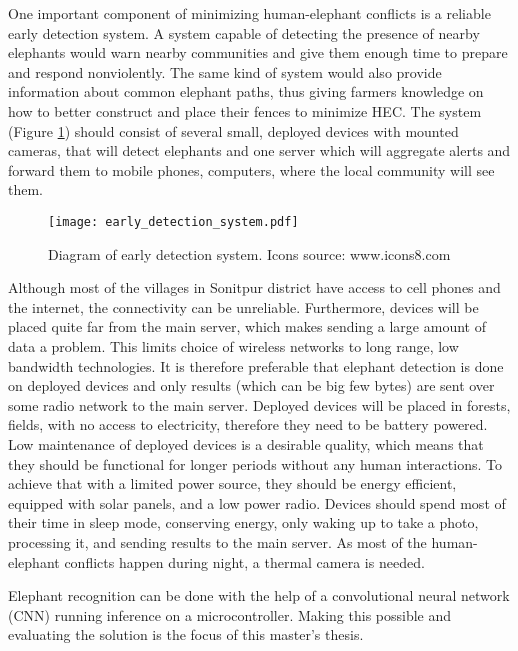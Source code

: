 One important component of minimizing human-elephant conflicts is a reliable early detection system. 
A system capable of detecting the presence of nearby elephants would warn nearby communities and give them enough time to prepare and respond nonviolently.
The same kind of system would also provide information about common elephant paths, thus giving farmers knowledge on how to better construct and place their fences to minimize HEC.
The system (Figure \ref{early_detection_system}) should consist of several small, deployed devices with mounted cameras, that will detect elephants and one server which will aggregate alerts and forward them to mobile phones, computers, where the local community will see them.

\begin{figure}[ht]
        \centering
        \texttt{[image: early\_detection\_system.pdf]} 
        \caption{Diagram of early detection system. Icons source: www.icons8.com}
        \label{early_detection_system}
\end{figure}

Although most of the villages in Sonitpur district have access to cell phones and the internet, the connectivity can be unreliable\cite{wildlabs-elephants}. 
Furthermore, devices will be placed quite far from the main server, which makes sending a large amount of data a problem. 
This limits choice of wireless networks to long range, low bandwidth technologies.
It is therefore preferable that elephant detection is done on deployed devices and only results (which can be big few bytes) are sent over some radio network to the main server.
Deployed devices will be placed in forests, fields, with no access to electricity, therefore they need to be battery powered.
Low maintenance of deployed devices is a desirable quality, which means that they should be functional for longer periods without any human interactions.
To achieve that with a limited power source, they should be energy efficient, equipped with solar panels, and a low power radio.
Devices should spend most of their time in sleep mode, conserving energy, only waking up to take a photo, processing it, and sending results to the main server.
As most of the human-elephant conflicts happen during night\cite{wildlabs-elephants}, a thermal camera is needed.

Elephant recognition can be done with the help of a convolutional neural network (CNN) running inference on a microcontroller. 
Making this possible and evaluating the solution is the focus of this master's thesis.


